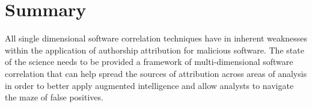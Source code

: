 \documentclass[12pt]{report}
\begin{document}

\section{Summary}
All single dimensional software correlation techniques have in inherent weaknesses within the application of authorship attribution for malicious software.  The state of the science needs to be provided a framework of multi-dimensional software correlation that can help spread the sources of attribution across areas of analysis in order to better apply augmented intelligence and allow analysts to navigate the maze of false positives.  

\end{document}

